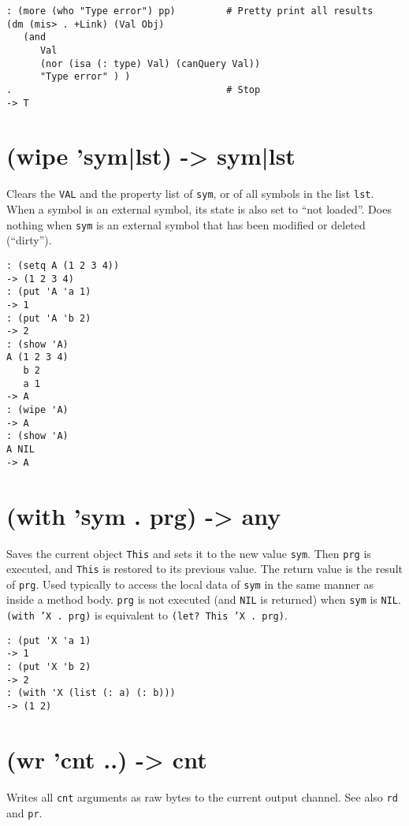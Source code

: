 {{{{{{{{\begin{verbatim}
: (more (who "Type error") pp)         # Pretty print all results
(dm (mis> . +Link) (Val Obj)
   (and
      Val
      (nor (isa (: type) Val) (canQuery Val))
      "Type error" ) )
.                                      # Stop
-> T
\end{verbatim}

 
\section{(wipe 'sym|lst) -> sym|lst}
\label{sec-8-1-23-7}


Clears the \texttt{VAL} and the property list of \texttt{sym}, or of all symbols in
the list \texttt{lst}. When a symbol is an external symbol, its state is also
set to ``not loaded''. Does nothing when \texttt{sym} is an external symbol that
has been modified or deleted (``dirty'').


\begin{verbatim}
: (setq A (1 2 3 4))
-> (1 2 3 4)
: (put 'A 'a 1)
-> 1
: (put 'A 'b 2)
-> 2
: (show 'A)
A (1 2 3 4)
   b 2
   a 1
-> A
: (wipe 'A)
-> A
: (show 'A)
A NIL
-> A
\end{verbatim}

 
\section{(with 'sym . prg) -> any}
\label{sec-8-1-23-8}


Saves the current object \texttt{This} and sets it to the new value \texttt{sym}. Then
\texttt{prg} is executed, and \texttt{This} is restored to its previous value. The
return value is the result of \texttt{prg}. Used typically to access the local
data of \texttt{sym} in the same manner as inside a method body. \texttt{prg} is not
executed (and \texttt{NIL} is returned) when \texttt{sym} is \texttt{NIL}. \texttt{(with 'X . prg)}
is equivalent to \texttt{(let? This 'X . prg)}.


\begin{verbatim}
: (put 'X 'a 1)
-> 1
: (put 'X 'b 2)
-> 2
: (with 'X (list (: a) (: b)))
-> (1 2)
\end{verbatim}

 
\section{(wr 'cnt ..) -> cnt}
\label{sec-8-1-23-9}


Writes all \texttt{cnt} arguments as raw bytes to the current output channel.
See also \texttt{rd} and \texttt{pr}.


}}}}}}}}
